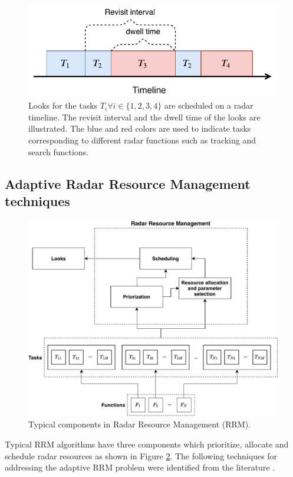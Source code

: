 \documentclass[english, 12pt, a4paper, elec, utf8, a-1b, online]{aaltothesis}
\begin{document}
\begin{figure}[h]
    \centering
    \includegraphics{figures/timeline.pdf}
    \caption{
        Looks for the tasks $T_i \forall i\in\{1,2,3,4\}$ are scheduled on a radar timeline. 
        The revisit interval and the dwell time of the looks are illustrated.
        The blue and red colors are used to indicate tasks corresponding to different radar functions such as tracking and search functions.
    }
    \label{fig:timeline}
\end{figure}

\subsection{Adaptive Radar Resource Management techniques} \label{sec:RRM_tech}

\begin{figure}[tb]
    \centering
    \includegraphics[width=.9\linewidth]{figures/RRM_diagram.pdf}
    \caption{Typical components in Radar Resource Management (RRM).}
    \label{fig:RRM_diagram}
\end{figure}

Typical RRM algorithms have three components which prioritize, allocate and schedule radar resources as shown in Figure \ref{fig:RRM_diagram}.
The following techniques for addressing the adaptive RRM problem were identified from the literature \cite{Koch1999, Krishnamurthy1999, Krishnamurthy2001, Wintenby2006, LaScala2006, Rajkumar1997, Rajkumar1998, Kastella1997, Kreucher2004, Kreucher2005, Xu2010}.
\end{document}
